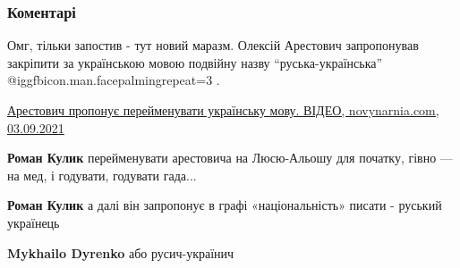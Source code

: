  
 
 
 
 
\subsubsection{Коментарі}

\begin{itemize}

Омг, тільки запостив - тут новий маразм. Олексій Арестович запропонував
закріпити за українською мовою подвійну назву
\enquote{руська-українська} @igg{fbicon.man.facepalming}{repeat=3} .

\href{https://novynarnia.com/2021/09/03/arestovych-proponuye-perejmenuvaty-ukrayinsku-movu}{%
Арестович пропонує перейменувати українську мову. ВІДЕО, novynarnia.com, 03.09.2021%
}

\begin{itemize}
 
\textbf{Роман Кулик} перейменувати арестовича на Люсю-Альошу для початку, гівно — на мед, і годувати, годувати гада...

 
\textbf{Роман Кулик} а далі він запропонує в графі «національність» писати - руський українець 🤡

 
\textbf{Mykhailo Dyrenko} або русич-українич


\end{itemize}
\end{itemize}
